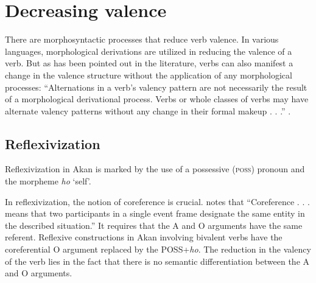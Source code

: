 \documentclass[output=paper]{langsci/langscibook}
\begin{document}
\ea
\label{ex:27.osam}
	\z

	\z
\z

\section{Decreasing valence}\label{§4:decreasing.osam}

There are morphosyntactic processes that reduce verb valence. In various languages, morphological derivations are utilized in reducing the valence of a verb. But as has been pointed out in the literature, verbs can also manifest a change in the valence structure without the application of any morphological processes: ``Alternations in a verb's valency pattern are not necessarily the result of a morphological derivational process. Verbs or whole classes of verbs may have alternate valency patterns without any change in their formal makeup . . .'' \citep[1131]{haspelmathmuellerbardey2004}.

\subsection{Reflexivization}\label{§4.1:reflexivization.osam}

Reflexivization in Akan is marked by the use of a possessive (\textsc{poss}) pronoun and the morpheme \textit{ho} `self'.

\ea
\label{ex:28.osam}
	\z

	\z
\z


In reflexivization, the notion of coreference is crucial. \citet[44]{kemmer1993} notes that ``Coreference . . .  means that two participants in a single event frame designate the same entity in the described situation.''  It requires that the A and O arguments have the same referent. Reflexive constructions in Akan involving bivalent verbs have the coreferential O argument replaced by the POSS+\textit{ho}.  The reduction in the valency of the verb lies in the fact that there is no semantic differentiation between the A and O arguments. 
\end{document}
